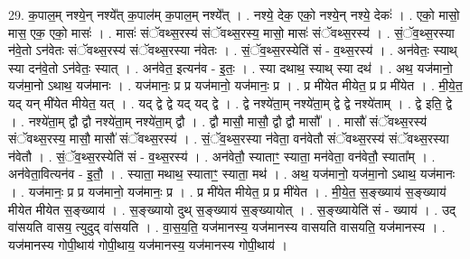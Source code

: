 \documentclass[17pt]{extarticle}
\begin{document}
29. क॒पाल॒म् नश्ये॒न् नश्ये᳚त् क॒पाल॑म् क॒पाल॒म् नश्ये᳚त् । . नश्ये॒ देक॒ एको॒ नश्ये॒न् नश्ये॒ देकः॑ । . एको॒ मासो॒ मास॒ एक॒ एको॒ मासः॑ । . मासः॑ संॅवथ्स॒रस्य॑ संॅवथ्स॒रस्य॒ मासो॒ मासः॑ संॅवथ्स॒रस्य॑ । . सं॒ॅव॒थ्स॒रस्या न॑वे॒तो ऽन॑वेतः संॅवथ्स॒रस्य॑ संॅवथ्स॒रस्या न॑वेतः । . सं॒ॅव॒थ्स॒रस्येति॑ सं - व॒थ्स॒रस्य॑ । . अन॑वेतः॒ स्याथ् स्या दन॑वे॒तो ऽन॑वेतः॒ स्यात् । . अन॑वेत॒ इत्यन॑व - इ॒तः॒ । . स्या दथाथ॒ स्याथ् स्या दथ॑ । . अथ॒ यज॑मानो॒ यज॑मा॒नो ऽथाथ॒ यज॑मानः । . यज॑मानः॒ प्र प्र यज॑मानो॒ यज॑मानः॒ प्र । . प्र मी॑येत मीयेत॒ प्र प्र मी॑येत । . मी॒ये॒त॒ यद् यन् मी॑येत मीयेत॒ यत् । . यद् द्वे द्वे यद् यद् द्वे । . द्वे नश्ये॑ता॒म् नश्ये॑ता॒म् द्वे द्वे नश्ये॑ताम् । . द्वे इति॒ द्वे । . नश्ये॑ता॒म् द्वौ द्वौ नश्ये॑ता॒म् नश्ये॑ता॒म् द्वौ । . द्वौ मासौ॒ मासौ॒ द्वौ द्वौ मासौ᳚ । . मासौ॑ संॅवथ्स॒रस्य॑ संॅवथ्स॒रस्य॒ मासौ॒ मासौ॑ संॅवथ्स॒रस्य॑ । . सं॒ॅव॒थ्स॒रस्या न॑वेता॒ वन॑वेतौ संॅवथ्स॒रस्य॑ संॅवथ्स॒रस्या न॑वेतौ । . सं॒ॅव॒थ्स॒रस्येति॑ सं - व॒थ्स॒रस्य॑ । . अन॑वेतौ॒ स्याताꣳ॒॒ स्याता॒ मन॑वेता॒ वन॑वेतौ॒ स्याता᳚म् । . अन॑वेता॒वित्यन॑व - इ॒तौ॒ । . स्याता॒ मथाथ॒ स्याताꣳ॒॒ स्याता॒ मथ॑ । . अथ॒ यज॑मानो॒ यज॑मा॒नो ऽथाथ॒ यज॑मानः । . यज॑मानः॒ प्र प्र यज॑मानो॒ यज॑मानः॒ प्र । . प्र मी॑येत मीयेत॒ प्र प्र मी॑येत । . मी॒ये॒त॒ स॒ङ्ख्याय॑ स॒ङ्ख्याय॑ मीयेत मीयेत स॒ङ्ख्याय॑ । . स॒ङ्ख्यायो दुथ् स॒ङ्ख्याय॑ स॒ङ्ख्यायोत् । . स॒ङ्ख्यायेति॑ सं - ख्याय॑ । . उद् वा॑सयति वासय॒ त्युदुद् वा॑सयति । . वा॒स॒य॒ति॒ यज॑मानस्य॒ यज॑मानस्य वासयति वासयति॒ यज॑मानस्य । . यज॑मानस्य गोपी॒थाय॑ गोपी॒थाय॒ यज॑मानस्य॒ यज॑मानस्य गोपी॒थाय॑ । \newline
\end{document}
